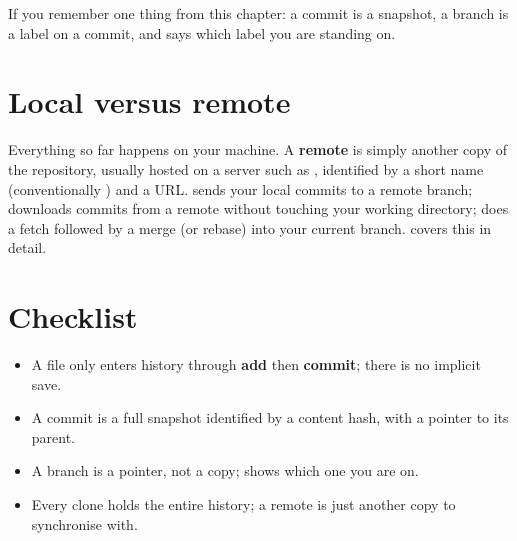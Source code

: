 \begin{ruleofthumb}
If you remember one thing from this chapter: a commit is a snapshot, a
branch is a label on a commit, and  says which label you are
standing on.
\end{ruleofthumb}

\section{Local versus remote}

Everything so far happens on your machine. A \textbf{remote} is simply
another copy of the repository, usually hosted on a server such as
\GitHub{}, identified by a short name (conventionally ) and
a URL.  sends your local commits to a remote branch;
 downloads commits from a remote without touching your
working directory;  does a fetch followed by a merge (or
rebase) into your current branch.  covers this in
detail.

\section{Checklist}
\label{sec:basics:checklist}

\begin{itemize}
  \item A file only enters history through \textbf{add} then
        \textbf{commit}; there is no implicit save.
  \item A commit is a full snapshot identified by a content hash, with
        a pointer to its parent.
  \item A branch is a pointer, not a copy;  shows which one
        you are on.
  \item Every clone holds the entire history; a remote is just another
        copy to synchronise with.
\end{itemize}
